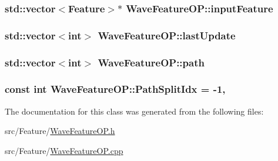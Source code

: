 \hypertarget{class_wave_feature_o_p_a2e67fe9dc06889453b70fe6efa19554f}{
\subsubsection[{input\+Feature}]{\setlength{\rightskip}{0pt plus 5cm}std\+::vector$<${\bf Feature}$>$$\ast$ Wave\+Feature\+O\+P\+::input\+Feature\hspace{0.3cm}{\ttfamily [private]}}}\label{class_wave_feature_o_p_a2e67fe9dc06889453b70fe6efa19554f}
\hypertarget{class_wave_feature_o_p_abb3904a95a48013acf81a589a73983c0}{
\subsubsection[{last\+Update}]{\setlength{\rightskip}{0pt plus 5cm}std\+::vector$<$int$>$ Wave\+Feature\+O\+P\+::last\+Update\hspace{0.3cm}{\ttfamily [private]}}}\label{class_wave_feature_o_p_abb3904a95a48013acf81a589a73983c0}
\hypertarget{class_wave_feature_o_p_a7e91a4de4afa4703c7e2e77e2ad6b73d}{
\subsubsection[{path}]{\setlength{\rightskip}{0pt plus 5cm}std\+::vector$<$int$>$ Wave\+Feature\+O\+P\+::path\hspace{0.3cm}{\ttfamily [private]}}}\label{class_wave_feature_o_p_a7e91a4de4afa4703c7e2e77e2ad6b73d}
\hypertarget{class_wave_feature_o_p_ad4482e96f3bca81925861baa598d01ed}{
\subsubsection[{Path\+Split\+Idx}]{\setlength{\rightskip}{0pt plus 5cm}const int Wave\+Feature\+O\+P\+::\+Path\+Split\+Idx = -\/1\hspace{0.3cm}{\ttfamily [static]}, {\ttfamily [private]}}}\label{class_wave_feature_o_p_ad4482e96f3bca81925861baa598d01ed}


The documentation for this class was generated from the following files\+:\begin{DoxyCompactItemize}
\item 
src/\+Feature/\hyperlink{_wave_feature_o_p_8h}{Wave\+Feature\+O\+P.\+h}\item 
src/\+Feature/\hyperlink{_wave_feature_o_p_8cpp}{Wave\+Feature\+O\+P.\+cpp}\end{DoxyCompactItemize}
